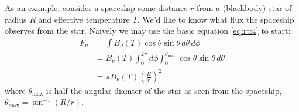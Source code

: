 \documentclass[10pt]{article}
\numberwithin{equation}{section}
\begin{document}
As an example, consider a spaceship some distance $r$ from a (blackbody) star
of radius $R$ and effective temperature $T$. We'd like to know what flux the
spaceship observes from the star. Naively we may use the basic equation
\eqref{eq:rt:4} to start:
\begin{align}
  \label{eq:rt:6} F_\nu &= \int B_\nu(T)\cos\theta\sin\theta\,d\theta\,d\phi\\
  \label{eq:rt:7} &= B_\nu(T) \int_0^{2\pi} d\phi\int_0^{\theta_{\mathrm{max}}}
  \cos\theta\sin\theta\,d\theta\\
  \label{eq:rt:8} &= \pi B_\nu(T)\left(\frac{R}{r}\right)^2
\end{align}
where $\theta_{\mathrm{max}}$ is half the angular diamter of the star as seen
from the spaceship, $\theta_{\mathrm{max}} = \sin^{-1}(R/r)$.
\end{document}
